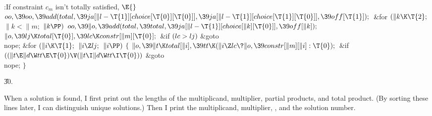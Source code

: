 \B{}:If constraint $c_m$ isn't totally
satisfied, \X${}\E{}$\6
$\\{oo},\39\\{oo},\39\\{add}(\\{total},\39\\{ja}[\|l-\T{1}][\\{choice}[\T{0}][%
\T{0}]],\39\\{ja}[\|l-\T{1}][\\{choice}[\T{1}][\T{0}]],\39\\{off}[\T{1}]);{}$\6
\&{for} ${}(\|k\K\T{2};{}$ ${}\|k<\|m;{}$ ${}\|k\PP){}$\1\5
${}\\{oo},\39\|o,\39\\{add}(\\{total},\39\\{total},\39\\{ja}[\|l-\T{1}][%
\\{choice}[\|k][\T{0}]],\39\\{off}[\|k]);{}$\2\6
${}\|o,\39\\{lj}\K\\{total}[\T{0}],\39\\{lc}\K\\{constr}[\|m][\T{0}];{}$\6
\&{if} ${}(\\{lc}>\\{lj}){}$\1\5
\&{goto} \\{nope};\2\6
\&{for} ${}(\|i\K\T{1};{}$ ${}\|i\Z\\{lj};{}$ ${}\|i\PP){}$\5
${}\{{}$\1\6
${}\|o,\39\|t\K\\{total}[\|i],\39\\{tt}\K(\|i\Z\\{lc}\?\|o,\39\\{constr}[\|m][%
\|i]:\T{0});{}$\6
\&{if} ${}((\|t\E\|d\W\\{tt}\E\T{0})\V(\|t\I\|d\W\\{tt}\I\T{0})){}$\1\5
\&{goto} \\{nope};\2\6
\4${}\}{}$\2\par
\U30.\fi

When a solution is found, I first print out
the lengths of
the multiplicand, multiplier, partial products, and total product.
(By sorting these lines later, I can distinguish unique solutions.)
Then I print the multiplicand, multiplier, , and the solution number.

